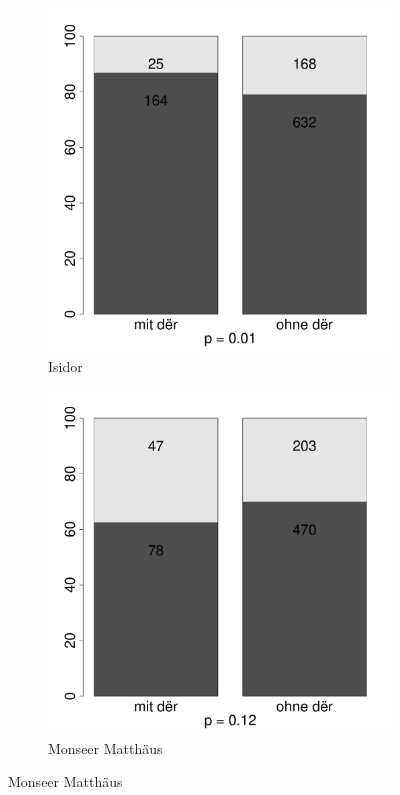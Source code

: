 \begin{figure}[p]
\begin{subfigure}[b]{.5\linewidth}
  \includegraphics[height=.25\textheight]{generated/images/numerus-isidor}
\caption {Isidor}
\end{subfigure}%
\begin{subfigure}[b]{.5\linewidth}
  \includegraphics[height=.25\textheight]{generated/images/numerus-matt}
\caption {Monseer Matthäus}
\end{subfigure}


\end{figure}
